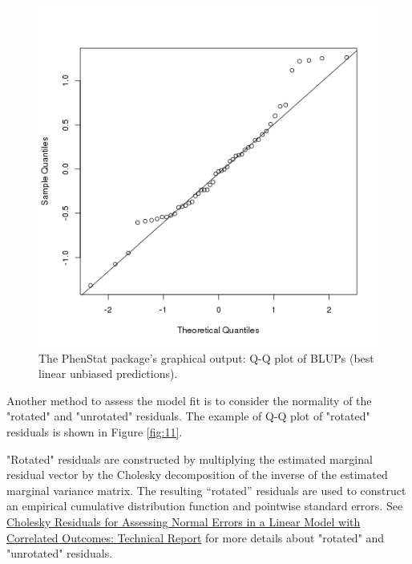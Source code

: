 \documentclass[12pt,a4paper]{article}
\begin{document}
\begin{figure}[!htpb]%
\centerline{\includegraphics[scale=0.5]{qqplotRandomEffects.png}}
\caption{The PhenStat package's graphical output: Q-Q plot of BLUPs (best linear unbiased predictions).}\label{fig:10}
\end{figure}

Another method to assess the model fit is to consider the normality of the "rotated" and "unrotated" residuals. The example of Q-Q plot of "rotated" residuals is shown in Figure \ref{fig:11}. 

"Rotated" residuals are constructed by multiplying the estimated marginal residual vector by
the Cholesky decomposition of the inverse of the estimated marginal variance
matrix. The resulting “rotated” residuals are used to construct an empirical cumulative distribution function and pointwise standard errors. See
\href{http://biostats.bepress.com/cgi/viewcontent.cgi?article=1019&context=harvardbiostat}{Cholesky Residuals for Assessing Normal
Errors in a Linear Model with Correlated
Outcomes: Technical Report} 
 for more details about "rotated" and "unrotated" residuals.
\end{document}

